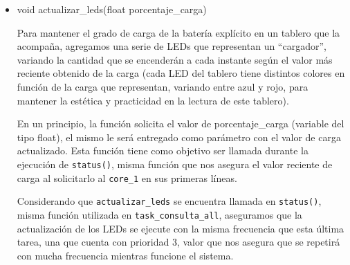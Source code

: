                \begin{itemize} [label = ·]
                \setlength{\itemindent}{1.5em}
                
                    \item void actualizar\_leds(float porcentaje\_carga)\par
                        Para mantener el grado de carga de la batería explícito en un tablero que la acompaña, agregamos una serie de LEDs que representan un “cargador”, variando la cantidad que se encenderán a cada instante según el valor más reciente obtenido de la carga (cada LED del tablero tiene distintos colores en función de la carga que representan, variando entre azul y rojo, para mantener la estética y practicidad en la lectura de este tablero).\par
                        En un principio, la función solicita el valor de porcentaje\_carga (variable del tipo float), el mismo le será entregado como parámetro con el valor de carga actualizado. Esta función tiene como objetivo ser llamada durante la ejecución de \texttt{status()}, misma función que nos asegura el valor reciente de carga al solicitarlo al \texttt{core\_1} en sus primeras líneas.\par
                        Considerando que \texttt{actualizar\_leds} se encuentra llamada en \texttt{status()}, misma función utilizada en \texttt{task\_consulta\_all}, aseguramos que la actualización de los LEDs se ejecute con la misma frecuencia que esta última tarea, una que cuenta con prioridad 3, valor que nos asegura que se repetirá con mucha frecuencia mientras funcione el sistema.\par
                        
                \end{itemize}
                
